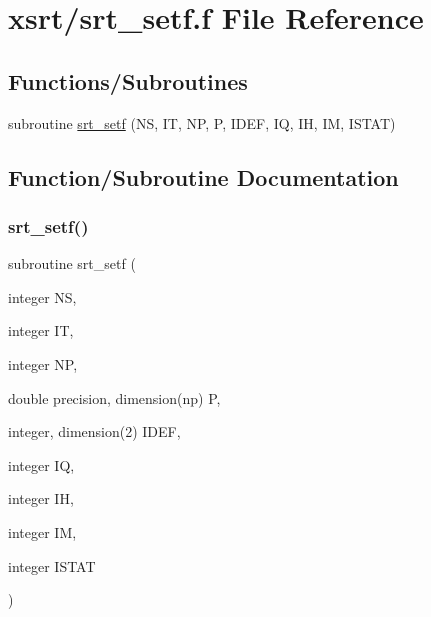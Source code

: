 \hypertarget{srt__setf_8f}{}\section{xsrt/srt\+\_\+setf.f File Reference}
\label{srt__setf_8f}
\subsection*{Functions/\+Subroutines}
\begin{DoxyCompactItemize}
\item 
subroutine \hyperlink{srt__setf_8f_a189865899e28247727d32a401824af88}{srt\+\_\+setf} (NS, IT, NP, P, I\+D\+EF, IQ, IH, IM, I\+S\+T\+AT)
\end{DoxyCompactItemize}


\subsection{Function/\+Subroutine Documentation}
\mbox{\label{srt__setf_8f_a189865899e28247727d32a401824af88}} 
\subsubsection{\texorpdfstring{srt\+\_\+setf()}{srt\_setf()}}
{\footnotesize\ttfamily subroutine srt\+\_\+setf (\begin{DoxyParamCaption}\item[{integer}]{NS,  }\item[{integer}]{IT,  }\item[{integer}]{NP,  }\item[{double precision, dimension(np)}]{P,  }\item[{integer, dimension(2)}]{I\+D\+EF,  }\item[{integer}]{IQ,  }\item[{integer}]{IH,  }\item[{integer}]{IM,  }\item[{integer}]{I\+S\+T\+AT }\end{DoxyParamCaption})}

